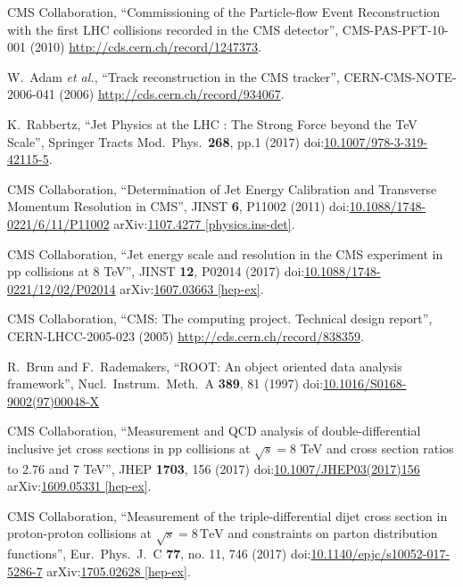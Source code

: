 \begin{thebibliography}{99}
CMS Collaboration, ``Commissioning of the Particle-flow Event Reconstruction with the first LHC collisions recorded in the CMS detector'', CMS-PAS-PFT-10-001 (2010) \url{http://cds.cern.ch/record/1247373}.

W.~Adam {\it et al.}, ``Track reconstruction in the CMS tracker'', CERN-CMS-NOTE-2006-041 (2006) \url{http://cds.cern.ch/record/934067}.

K.~Rabbertz, ``Jet Physics at the LHC : The Strong Force beyond the TeV Scale'', Springer Tracts Mod.\ Phys.\  {\bf 268}, pp.1 (2017) doi:\href{http://dx.doi.org/10.1007/978-3-319-42115-5}{10.1007/978-3-319-42115-5}.

CMS Collaboration, ``Determination of Jet Energy Calibration and Transverse Momentum Resolution in CMS'', JINST {\bf 6}, P11002 (2011) doi:\href{http://dx.doi.org/10.1088/1748-0221/6/11/P11002}{10.1088/1748-0221/6/11/P11002} arXiv:\href{http://arxiv.org/abs/arXiv:1107.4277}{1107.4277 [physics.ins-det]}.

CMS Collaboration, ``Jet energy scale and resolution in the CMS experiment in pp collisions at 8 TeV'', JINST {\bf 12}, P02014 (2017) doi:\href{http://dx.doi.org/10.1088/1748-0221/12/02/P02014}{10.1088/1748-0221/12/02/P02014} arXiv:\href{https://arxiv.org/abs/1607.03663}{1607.03663 [hep-ex]}.

CMS Collaboration, ``CMS: The computing project. Technical design report'', CERN-LHCC-2005-023 (2005) \url{http://cds.cern.ch/record/838359}.

R.~Brun and F.~Rademakers, ``ROOT: An object oriented data analysis framework'', Nucl.\ Instrum.\ Meth.\ A {\bf 389}, 81 (1997) doi:\href{http://dx.doi.org/10.1016/S0168-9002(97)00048-X}{10.1016/S0168-9002(97)00048-X}



CMS Collaboration, ``Measurement and QCD analysis of double-differential inclusive jet cross sections in pp collisions at $ \sqrt{s}=8 $ TeV and cross section ratios to 2.76 and 7 TeV'', JHEP {\bf 1703}, 156 (2017) doi:\href{http://dx.doi.org/10.1007/JHEP03(2017)156}{10.1007/JHEP03(2017)156} arXiv:\href{https://arxiv.org/abs/1609.05331}{1609.05331 [hep-ex]}.

CMS Collaboration, ``Measurement of the triple-differential dijet cross section in proton-proton collisions at $\sqrt{s}=8\,\text {TeV} $ and constraints on parton distribution functions'', Eur.\ Phys.\ J.\ C {\bf 77}, no. 11, 746 (2017) doi:\href{http://dx.doi.org/10.1140/epjc/s10052-017-5286-7}{10.1140/epjc/s10052-017-5286-7} arXiv:\href{https://arxiv.org/abs/1705.02628}{1705.02628 [hep-ex]}.
 

\end{thebibliography}
